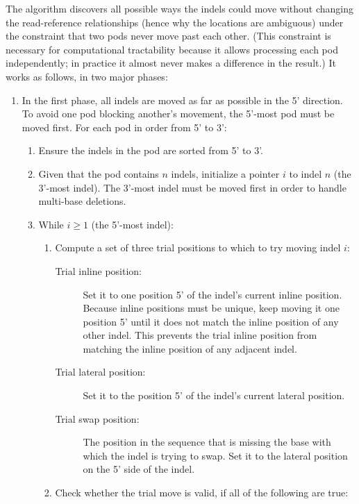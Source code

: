 \documentclass[11pt]{article}
\begin{document}
The algorithm discovers all possible ways the indels could move without changing the read-reference relationships (hence why the locations are ambiguous) under the constraint that two pods never move past each other.
(This constraint is necessary for computational tractability because it allows processing each pod independently; in practice it almost never makes a difference in the result.)
It works as follows, in two major phases:
\begin{enumerate}
    \item In the first phase, all indels are moved as far as possible in the 5' direction.
    To avoid one pod blocking another's movement, the 5'-most pod must be moved first.
    For each pod in order from 5' to 3':
    \begin{enumerate}
        \item Ensure the indels in the pod are sorted from 5' to 3'.
        \item Given that the pod contains $n$ indels, initialize a pointer $i$ to indel $n$ (the 3'-most indel).
        The 3'-most indel must be moved first in order to handle multi-base deletions.
        \item While $i \ge 1$ (the 5'-most indel):
        \begin{enumerate}
            \item Compute a set of three trial positions to which to try moving indel $i$:
            \begin{description}
                \item[Trial inline position:] Set it to one position 5' of the indel's current inline position.
                Because inline positions must be unique, keep moving it one position 5' until it does not match the inline position of any other indel.
                This prevents the trial inline position from matching the inline position of any adjacent indel.
                \item[Trial lateral position:] Set it to the position 5' of the indel's current lateral position.
                \item[Trial swap position:] The position in the sequence that is missing the base with which the indel is trying to swap.
                Set it to the lateral position on the 5' side of the indel.
            \end{description}
            \item Check whether the trial move is valid, if all of the following are true:
            \begin{itemize}

\end{itemize}
\end{enumerate}
\end{enumerate}
\end{enumerate}
\end{document}
